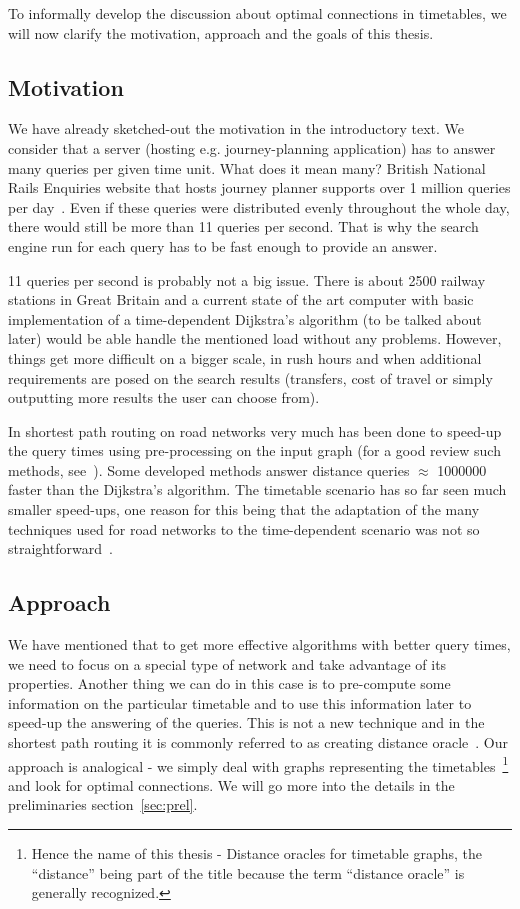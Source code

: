 \noindent To informally develop the discussion about optimal connections in timetables, we will now clarify the motivation, approach and the goals of this thesis.

\subsection{Motivation}

	\noindent We have already sketched-out the motivation in the introductory text. We consider that a server (hosting e.g. journey-planning application) has to answer many queries per given time unit. What does it mean many? British National Rails Enquiries website that hosts journey planner supports over 1 million queries per day~\cite{queriesnr}. Even if these queries were distributed evenly throughout the whole day, there would still be more than 11 queries per second. That is why the search engine run for each query has to be fast enough to provide an answer.
	
	11 queries per second is probably not a big issue. There is about 2500 railway stations in Great Britain and a current state of the art computer with basic implementation of a time-dependent Dijkstra's algorithm (to be talked about later) would be able handle the mentioned load without any problems. However, things get more difficult on a bigger scale, in rush hours and when additional requirements are posed on the search results (transfers, cost of travel or simply outputting more results the user can choose from).
	
	In shortest path routing on road networks very much has been done to speed-up the query times using pre-processing on the input graph (for a good review such methods, see~\cite{engineeringroute09}). Some developed methods answer distance queries $\approx$ 1000000 faster than the Dijkstra's algorithm. The timetable scenario has so far seen much smaller speed-ups, one reason for this being that the adaptation of the many techniques used for road networks to the time-dependent scenario was not so straightforward~\cite{engtimeexp09}.
		
\subsection{Approach}

	\noindent We have mentioned that to get more effective algorithms with better query times, we need to focus on a special type of network and take advantage of its properties. Another thing we can do in this case is to pre-compute some information on the particular timetable and to use this information later to speed-up the answering of the queries. This is not a new technique and in the shortest path routing it is commonly referred to as creating distance oracle~\cite{apxdo05}. Our approach is analogical - we simply deal with graphs representing the timetables~\footnote{Hence the name of this thesis - Distance oracles for timetable graphs, the ``distance'' being part of the title because the term ``distance oracle'' is generally recognized.} and look for optimal connections. We will go more into the details in the preliminaries section~\ref{sec:prel}.
	
